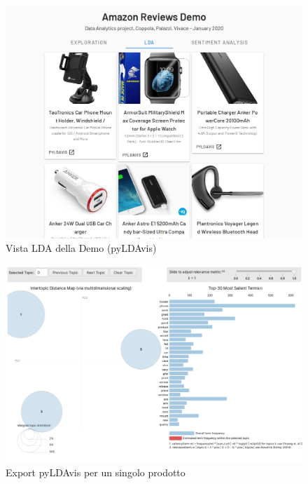 \begin{figure}[H]
  \centering
  \captionsetup{margin=1cm}
  \includegraphics[width=1\linewidth]{figures/ext/webapp2.png}
  \caption{Vista LDA della Demo (pyLDAvis)}
  \label{zipf_law}
\end{figure}

\begin{figure}[H]
  \centering
  \captionsetup{margin=1cm}
  \includegraphics[width=1\linewidth]{figures/ext/webapp3.png}
  \caption{Export pyLDAvis per un singolo prodotto}
  \label{zipf_law}
\end{figure}

